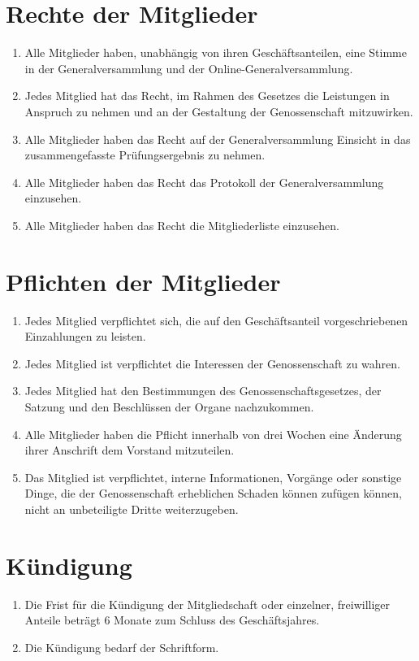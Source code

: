 \documentclass[a4paper, 12pt]{scrartcl}
\begin{document}
\section{Rechte der Mitglieder}
\begin{enumerate}
  \item Alle Mitglieder haben, unabhängig von ihren Geschäftsanteilen, eine Stimme in der Generalversammlung und der Online-Generalversammlung.
  \item Jedes Mitglied hat das Recht, im Rahmen des Gesetzes die Leistungen in Anspruch zu nehmen und an der Gestaltung der Genossenschaft mitzuwirken.
  \item Alle Mitglieder haben das Recht auf der Generalversammlung Einsicht in das zusammengefasste Prüfungsergebnis zu nehmen.
  \item Alle Mitglieder haben das Recht das Protokoll der Generalversammlung einzusehen.
  \item Alle Mitglieder haben das Recht die Mitgliederliste einzusehen.
\end{enumerate}

\section{Pflichten der Mitglieder}
\begin{enumerate}
  \item Jedes Mitglied verpflichtet sich, die auf den Geschäftsanteil vorgeschriebenen Einzahlungen zu leisten.
  \item Jedes Mitglied ist verpflichtet die Interessen der Genossenschaft zu wahren.
  \item Jedes Mitglied hat den Bestimmungen des Genossenschaftsgesetzes, der Satzung und den Beschlüssen der Organe nachzukommen.
  \item Alle Mitglieder haben die Pflicht innerhalb von drei Wochen eine Änderung ihrer Anschrift dem Vorstand mitzuteilen.
  \item Das Mitglied ist verpflichtet, interne Informationen, Vorgänge oder sonstige Dinge, die der Genossenschaft erheblichen Schaden können zufügen können, nicht an unbeteiligte Dritte weiterzugeben.
\end{enumerate}

\section{Kündigung}
\begin{enumerate}
  \item Die Frist für die Kündigung der Mitgliedschaft oder einzelner, freiwilliger Anteile beträgt 6 Monate zum Schluss des Geschäftsjahres.
  \item Die Kündigung bedarf der Schriftform.
\end{enumerate}
\end{document}
